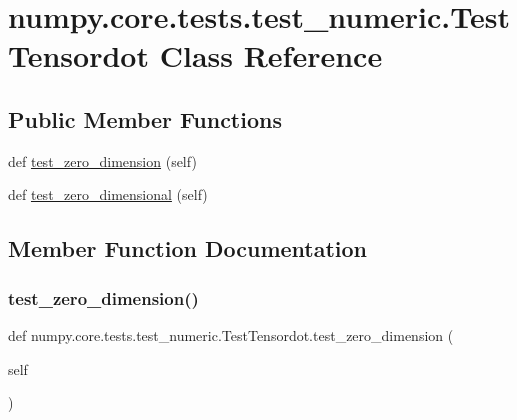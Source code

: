 \hypertarget{classnumpy_1_1core_1_1tests_1_1test__numeric_1_1TestTensordot}{}\section{numpy.\+core.\+tests.\+test\+\_\+numeric.\+Test\+Tensordot Class Reference}
\label{classnumpy_1_1core_1_1tests_1_1test__numeric_1_1TestTensordot}
\subsection*{Public Member Functions}
\begin{DoxyCompactItemize}
\item 
def \hyperlink{classnumpy_1_1core_1_1tests_1_1test__numeric_1_1TestTensordot_a9bba8ff49ce7b2cc8dc75d6f2766e20a}{test\+\_\+zero\+\_\+dimension} (self)
\item 
def \hyperlink{classnumpy_1_1core_1_1tests_1_1test__numeric_1_1TestTensordot_a19cff1b490847cf1c1b04d36f8fd3419}{test\+\_\+zero\+\_\+dimensional} (self)
\end{DoxyCompactItemize}


\subsection{Member Function Documentation}
\mbox{\label{classnumpy_1_1core_1_1tests_1_1test__numeric_1_1TestTensordot_a9bba8ff49ce7b2cc8dc75d6f2766e20a}} 
\subsubsection{\texorpdfstring{test\+\_\+zero\+\_\+dimension()}{test\_zero\_dimension()}}
{\footnotesize\ttfamily def numpy.\+core.\+tests.\+test\+\_\+numeric.\+Test\+Tensordot.\+test\+\_\+zero\+\_\+dimension (\begin{DoxyParamCaption}\item[{}]{self }\end{DoxyParamCaption})}

